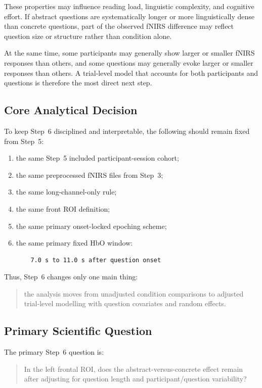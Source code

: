 \documentclass[11pt]{article}
\begin{document}
These properties may influence reading load, linguistic complexity, and cognitive effort.
If abstract questions are systematically longer or more linguistically dense than concrete questions,
part of the observed fNIRS difference may reflect question size or structure rather than condition alone.

At the same time, some participants may generally show larger or smaller fNIRS responses than others,
and some questions may generally evoke larger or smaller responses than others.
A trial-level model that accounts for both participants and questions is therefore the most direct
next step.

\subsection{Core Analytical Decision}
To keep Step~6 disciplined and interpretable, the following should remain fixed from Step~5:
\begin{enumerate}
    \item the same Step~5 included participant-session cohort;
    \item the same preprocessed fNIRS files from Step~3;
    \item the same long-channel-only rule;
    \item the same front ROI definition;
    \item the same primary onset-locked epoching scheme;
    \item the same primary fixed HbO window:
    \begin{verbatim}
    7.0 s to 11.0 s after question onset
    \end{verbatim}
\end{enumerate}

Thus, Step~6 changes only one main thing:
\begin{quote}
the analysis moves from unadjusted condition comparisons to adjusted trial-level modelling
with question covariates and random effects.
\end{quote}

\subsection{Primary Scientific Question}
The primary Step~6 question is:
\begin{quote}
In the left frontal ROI, does the abstract-versus-concrete effect remain after adjusting for
question length and participant/question variability?
\end{quote}
\end{document}
